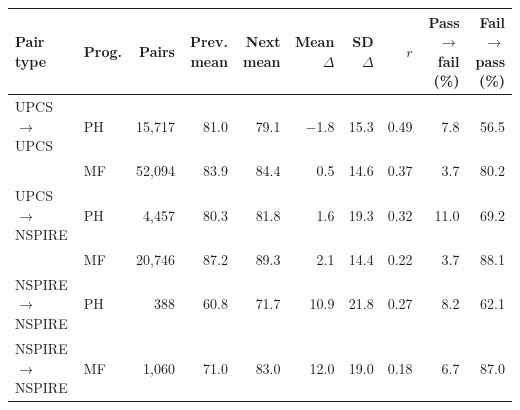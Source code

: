 \begin{tabular}{llrrrrrrrr}
\toprule
Pair type & Prog. & Pairs & Prev. mean & Next mean & Mean $\Delta$ & SD $\Delta$ & $r$ & Pass$\to$fail (\%) & Fail$\to$pass (\%) \\
\midrule
UPCS $\rightarrow$ UPCS & PH & 15,717 & 81.0 & 79.1 & $-$1.8 & 15.3 & 0.49 & 7.8 & 56.5 \\
 & MF & 52,094 & 83.9 & 84.4 & 0.5 & 14.6 & 0.37 & 3.7 & 80.2 \\
UPCS $\rightarrow$ NSPIRE & PH & 4,457 & 80.3 & 81.8 & 1.6 & 19.3 & 0.32 & 11.0 & 69.2 \\
 & MF & 20,746 & 87.2 & 89.3 & 2.1 & 14.4 & 0.22 & 3.7 & 88.1 \\
NSPIRE $\rightarrow$ NSPIRE & PH & 388 & 60.8 & 71.7 & 10.9 & 21.8 & 0.27 & 8.2 & 62.1 \\
NSPIRE $\rightarrow$ NSPIRE & MF & 1,060 & 71.0 & 83.0 & 12.0 & 19.0 & 0.18 & 6.7 & 87.0 \\
\bottomrule
\end{tabular}
